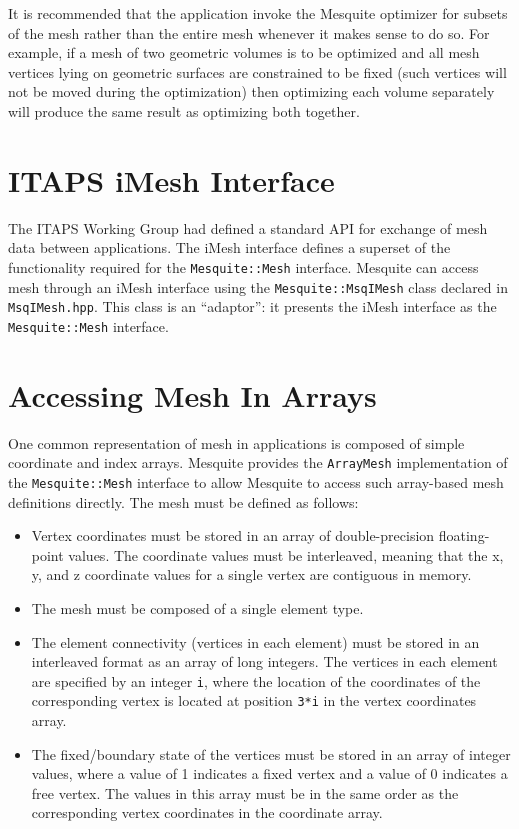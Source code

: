 It is recommended that the application invoke the Mesquite optimizer for subsets
of the mesh rather than the entire mesh whenever it makes sense to do so.  For
example, if a mesh of two geometric volumes is to be optimized and all mesh
vertices lying on geometric surfaces are constrained to be fixed (such vertices
will not be moved during the optimization) then optimizing each volume separately
will produce the same result as optimizing both together.  


\section{ITAPS iMesh Interface}

The ITAPS Working Group had defined a standard API for exchange of mesh data between applications.  The iMesh interface\cite{imesh} defines a superset of the functionality required for the \texttt{Mesquite::Mesh} interface.  Mesquite can access mesh through an iMesh interface using the \texttt{Mesquite::MsqIMesh} class declared in \texttt{MsqIMesh.hpp}.  This class is an ``adaptor'':  it presents the iMesh interface as the \texttt{Mesquite::Mesh} interface.  


\section{Accessing Mesh In Arrays} \label{sec::ArrayMesh}

One common representation of mesh in applications is composed of simple 
coordinate and index arrays.  Mesquite provides the \texttt{ArrayMesh} implementation of the \texttt{Mesquite::Mesh} interface to allow Mesquite
to access such array-based mesh definitions directly.  The mesh must be
defined as follows:
\begin{itemize}
\item Vertex coordinates must be stored in an array of double-precision
      floating-point values.  The coordinate values must be interleaved,
      meaning that the x, y, and z coordinate values for a single vertex
      are contiguous in memory.
\item The mesh must be composed of a single element type.
\item The element connectivity (vertices in each element) must be stored
      in an interleaved format as an array of long integers.  The vertices
      in each element are specified by an integer \texttt{i}, where the location       of the coordinates of the corresponding vertex is located at position
      \texttt{3*i} in the vertex coordinates array.
\item The fixed/boundary state of the vertices must be stored in an array
      of integer values, where a value of 1 indicates a fixed vertex and a 
      value of 0 indicates a free vertex.  The values in this array must
      be in the same order as the corresponding vertex coordinates in the
      coordinate array.
\end{itemize}

